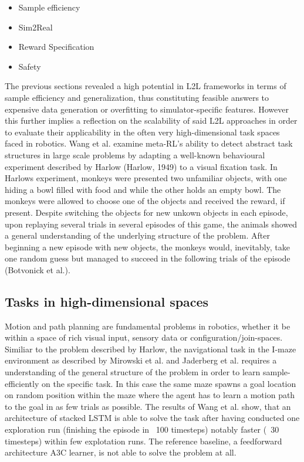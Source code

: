 \documentclass[letterpaper, 10 pt, conference]{ieeeconf}  %
\begin{document}
\begin{itemize}
        \item Sample efficiency
        \item Sim2Real
        \item Reward Specification
        \item Safety
\end{itemize}   

The previous sections revealed a high potential in L2L frameworks in terms of sample efficiency and generalization, thus constituting 
feasible answers to expensive data generation or overfitting to simulator-specific features. However this further implies a 
reflection on the scalability of said L2L approaches in order to evaluate their applicability in the often very
high-dimensional task spaces faced in robotics. \newline
Wang et al. examine meta-RL's ability to detect abstract task structures in large scale problems by adapting a well-known behavioural experiment 
described by Harlow (Harlow, 1949) to a visual fixation task. In Harlows experiment, monkeys were presented two unfamiliar objects, with one 
hiding a bowl filled with food and while the other holds an empty bowl. The monkeys were allowed to choose one of the objects and received the reward, if present. 
Despite switching the objects for new unkown objects in each episode, upon replaying several trials in several episodes of this game, the animals showed
a general understanding of the underlying structure of the problem. After beginning a new episode with new objects, the monkeys would, inevitably, take 
one random guess but managed to succeed in the following trials of the episode (Botvonick et al.). \newline

\subsection{Tasks in high-dimensional spaces}

Motion and path planning are fundamental problems in robotics, whether it be within a space of rich visual input, sensory data or
configuration/join-spaces. Similiar to the problem described by Harlow, the navigational task in the I-maze environment as described by 
Mirowski et al. and Jaderberg et al. requires a understanding of the general structure of the problem in order to learn sample-efficiently 
on the specific task. In this case the same maze spawns a goal location on random position within the maze where the agent has to learn
a motion path to the goal in as few trials as possible. The results of Wang et al. show, that an architecture of stacked LSTM is able to 
solve the task after having conducted one exploration run (finishing the episode in ~100 timesteps) notably faster (~30 timesteps) within few
explotation runs. The reference baseline, a feedforward architecture A3C learner, is not able to solve the problem at all. 
 
\end{document}
